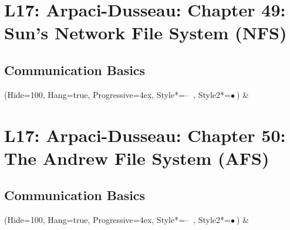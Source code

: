 \documentclass[11pt, oneside]{article}
\begin{document}
\section{L17: Arpaci-Dusseau: Chapter 49: Sun’s Network File System (NFS)}
\subsection{Communication Basics}
    \begin{easylist}  
    \ListProperties(Hide=100, Hang=true, Progressive=4ex, Style*=--\ , Style2*=$\bullet\ $)
        & 
    \end{easylist}

\section{L17: Arpaci-Dusseau: Chapter 50: The Andrew File System (AFS)}
\subsection{Communication Basics}
    \begin{easylist}  
    \ListProperties(Hide=100, Hang=true, Progressive=4ex, Style*=--\ , Style2*=$\bullet\ $)
        & 
    \end{easylist}
\clearpage
\end{document}
